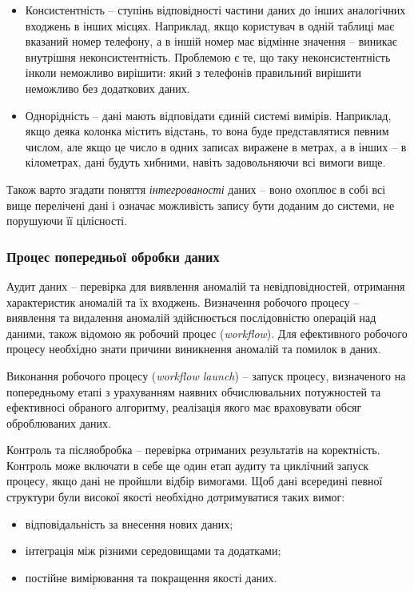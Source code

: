\begin{itemize}
	\item Консистентність – ступінь відповідності частини даних до інших аналогічних входжень в інших місцях. Наприклад, якщо користувач в одній таблиці має вказаний номер телефону, а в іншій номер має відмінне значення – виникає внутрішня неконсистентність. Проблемою є те, що таку неконсистентність інколи неможливо вирішити: який з телефонів правильний вирішити неможливо без додаткових даних.
	\item Однорідність – дані мають відповідати єдиній системі вимірів. Наприклад, якщо деяка колонка містить відстань, то вона буде представлятися певним числом, але якщо це число в одних записах виражене в метрах, а в інших – в кілометрах, дані будуть хибними, навіть задовольняючи всі вимоги вище.
\end{itemize}

Також варто згадати поняття \textit{інтегрованості} даних – воно охоплює в собі всі вище перелічені дані і означає можливість запису бути доданим до системи, не порушуючи її цілісності.

\subsubsection{Процес попередньої обробки даних}
Аудит даних – перевірка для виявлення аномалій та невідповідностей, отримання характеристик аномалій та їх входжень. 
Визначення робочого процесу – виявлення та видалення аномалій здійснюється послідовністю операцій над даними, також відомою як робочий процес (\textit{workflow}). Для ефективного робочого процесу необхідно знати причини виникнення аномалій та помилок в даних.

Виконання робочого процесу (\textit{workflow launch}) – запуск процесу, визначеного на попередньому етапі з урахуванням наявних обчислювальних потужностей та ефективносі обраного алгоритму, реалізація якого має враховувати обсяг оброблюваних даних.

Контроль та післяобробка – перевірка отриманих результатів на коректність. Контроль може включати в себе ще один етап аудиту та циклічний запуск процесу, якщо дані не пройшли відбір вимогами. Щоб дані всередині певної структури були високої якості необхідно дотримуватися таких вимог:
\begin{itemize}
	\item відповідальність за внесення нових даних;
	\item інтеграція між різними середовищами та додатками;
	\item постійне вимірювання та покращення якості даних.
\end{itemize}

